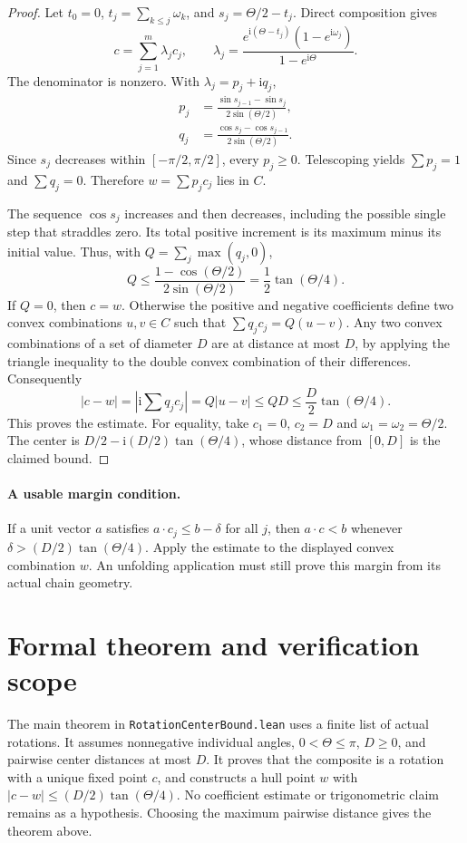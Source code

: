 \documentclass[11pt,letterpaper]{article}
\newcommand{\ii}{\mathrm{i}}
\begin{document}
\begin{proof}
Let $t_0=0$, $t_j=\sum_{k\le j}\omega_k$, and
$s_j=\Theta/2-t_j$. Direct composition gives
\[
 c=\sum_{j=1}^m\lambda_jc_j,\qquad
 \lambda_j=\frac{e^{\ii(\Theta-t_j)}(1-e^{\ii\omega_j})}
                     {1-e^{\ii\Theta}}.
\]
The denominator is nonzero. With $\lambda_j=p_j+\ii q_j$,
\begin{align*}
 p_j&=\frac{\sin s_{j-1}-\sin s_j}{2\sin(\Theta/2)},\\
 q_j&=\frac{\cos s_j-\cos s_{j-1}}{2\sin(\Theta/2)}.
\end{align*}
Since $s_j$ decreases within $[-\pi/2,\pi/2]$, every $p_j\ge0$.
Telescoping yields $\sum p_j=1$ and $\sum q_j=0$. Therefore
$w=\sum p_jc_j$ lies in $C$.

The sequence $\cos s_j$ increases and then decreases, including the possible
single step that straddles zero. Its total positive increment is its maximum
minus its initial value. Thus, with $Q=\sum_j\max(q_j,0)$,
\[
 Q\le\frac{1-\cos(\Theta/2)}{2\sin(\Theta/2)}
     =\frac12\tan(\Theta/4).
\]
If $Q=0$, then $c=w$. Otherwise the positive and negative coefficients define
two convex combinations $u,v\in C$ such that
$\sum q_jc_j=Q(u-v)$. Any two convex combinations of a set of diameter $D$
are at distance at most $D$, by applying the triangle inequality to the
double convex combination of their differences. Consequently
\[
 |c-w|=\left|\ii\sum q_jc_j\right|
       =Q|u-v|\le QD\le\frac D2\tan(\Theta/4).
\]
This proves the estimate. For equality, take $c_1=0$, $c_2=D$ and
$\omega_1=\omega_2=\Theta/2$. The center is
$D/2-\ii(D/2)\tan(\Theta/4)$, whose distance from $[0,D]$ is the claimed
bound.
\end{proof}

\paragraph{A usable margin condition.}
If a unit vector $a$ satisfies $a\cdot c_j\le b-\delta$ for all $j$, then
$a\cdot c<b$ whenever $\delta>(D/2)\tan(\Theta/4)$. Apply the estimate
to the displayed convex combination $w$. An unfolding application must still
prove this margin from its actual chain geometry.

\section{Formal theorem and verification scope}
The main theorem in \texttt{RotationCenterBound.lean}
uses a finite list of actual rotations. It
assumes nonnegative individual angles, $0<\Theta\le\pi$, $D\ge0$, and
pairwise center distances at most $D$. It proves that the composite is a
rotation with a unique fixed point $c$, and constructs a hull point $w$ with
$|c-w|\le(D/2)\tan(\Theta/4)$. No coefficient estimate or trigonometric
claim remains as a hypothesis. Choosing the maximum pairwise distance gives
the theorem above.
\end{document}
